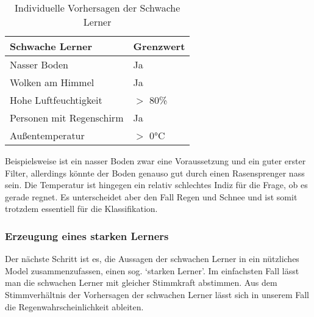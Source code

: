 \begin{table}[h]
    \centering
    \begin{tabular}{|l|l|}
    \hline
    \textbf{Schwache Lerner}      & \textbf{Grenzwert}   \\ \hline
    Nasser Boden               & Ja                  \\ \hline
    Wolken am Himmel           & Ja                  \\ \hline
    Hohe Luftfeuchtigkeit      & $>$ 80\%             \\ \hline
    Personen mit Regenschirm   & Ja                  \\ \hline
    Außentemperatur            & $>$ 0°C             \\ \hline
    \end{tabular}
    \caption{Individuelle Vorhersagen der Schwache Lerner}
    \label{tab:weak_learners}
\end{table}

Beispielsweise ist ein nasser Boden zwar eine Voraussetzung und ein guter erster Filter, allerdings könnte der Boden genauso gut durch einen Rasensprenger nass sein.
\newline
Die Temperatur ist hingegen ein relativ schlechtes Indiz für die Frage, ob es gerade regnet. Es unterscheidet aber den Fall Regen und Schnee und ist somit trotzdem essentiell für die Klassifikation.

\subsubsection{Erzeugung eines starken Lerners}
Der nächste Schritt ist es, die Aussagen der schwachen Lerner in ein nützliches Model zusammenzufassen, einen sog. `starken Lerner'. Im einfachsten Fall lässt man die schwachen Lerner mit gleicher Stimmkraft abstimmen. Aus dem Stimmverhältnis der Vorhersagen der schwachen Lerner lässt sich in unserem Fall die Regenwahrscheinlichkeit ableiten.

